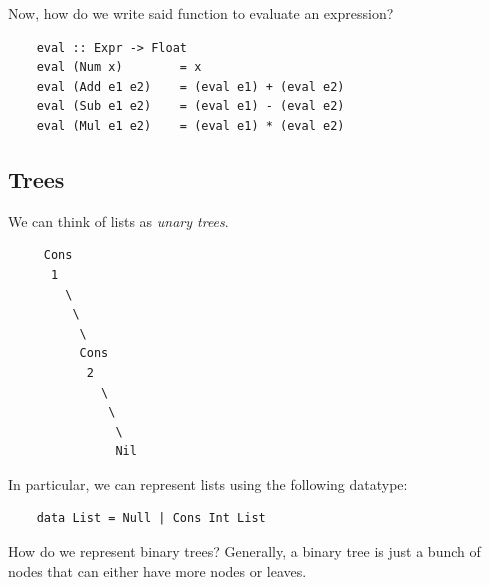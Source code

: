 \documentclass[letterpaper]{article}
\begin{document}
Now, how do we write said function to evaluate an expression?
\begin{verbatim}
    eval :: Expr -> Float 
    eval (Num x)        = x
    eval (Add e1 e2)    = (eval e1) + (eval e2)
    eval (Sub e1 e2)    = (eval e1) - (eval e2)
    eval (Mul e1 e2)    = (eval e1) * (eval e2)
\end{verbatim}


\subsection{Trees}
We can think of lists as \emph{unary trees}. 
\begin{verbatim}
     Cons 
      1  
        \
         \ 
          \ 
          Cons 
           2
             \ 
              \ 
               \ 
               Nil 
\end{verbatim}

In particular, we can represent lists using the following datatype:
\begin{verbatim}
    data List = Null | Cons Int List\end{verbatim}
How do we represent binary trees? Generally, a binary tree is just a bunch of nodes that can either have more nodes or leaves. 
\end{document}
